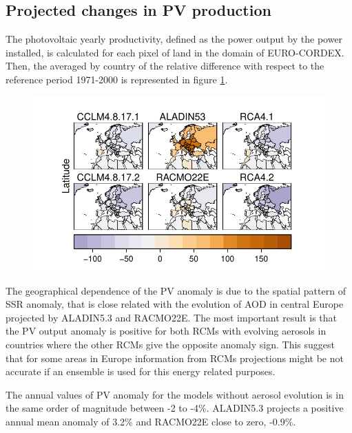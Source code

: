 \subsection{Projected changes in PV production}

The photovoltaic yearly productivity, defined as the power output by the power installed, is calculated for each pixel of land in the domain of EURO-CORDEX. Then, the averaged by country of the relative difference with respect to the reference period 1971-2000 is represented in figure \ref{fig:pvcountry}.


\begin{figure}[h!]
    \includegraphics[width=1\textwidth]{figs/capitulo7/bycountrytodos.pdf}
    \label{fig:pvcountry}
  \caption{}
\end{figure}

The geographical dependence of the PV anomaly is due to the spatial pattern of SSR anomaly, that is close related with the evolution of AOD in central Europe projected by ALADIN5.3 and RACMO22E. The most important result is that the PV output anomaly is positive for both RCMs with evolving aerosols in countries where the other RCMs give the opposite anomaly sign. This suggest that for some areas in Europe information from RCMs projections might be not accurate if an ensemble is used for this energy related purposes.

The annual values of PV anomaly for the models without aerosol evolution is in the same order of magnitude between -2 to -4\%. ALADIN5.3 projects a positive annual mean anomaly of 3.2\% and RACMO22E close to zero, -0.9\%.


